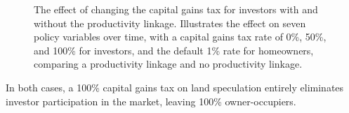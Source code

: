 \begin{figure}[h!tb]   %
    \centering
\caption[The effect of changing the capital gains tax for investors with and without the productivity linkage]{The effect of changing the capital gains tax for investors with and without the productivity linkage. Illustrates the effect on seven policy variables over time, with a capital gains tax rate of 0\%, 50\%, and 100\% for investors, and the default 1\% rate for homeowners, comparing a productivity linkage and no productivity linkage.}
    \label{fig:CG-invest_link_W-WO-Cost-of-capital}
\end{figure}


In both cases, a 100\% capital gains tax on land speculation entirely eliminates investor participation in the market, leaving 100\%  owner-occupiers. 

